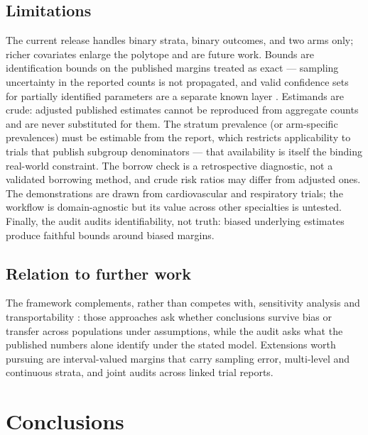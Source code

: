 \documentclass[article]{ajs}
\begin{document}
\subsection{Limitations}

The current release handles binary strata, binary outcomes, and two arms
only; richer covariates enlarge the polytope and are future work. Bounds
are identification bounds on the published margins treated as exact ---
sampling uncertainty in the reported counts is not propagated, and
valid confidence sets for partially identified parameters are a
separate known layer \citep{imbens2004}. Estimands are crude: adjusted
published estimates cannot be reproduced from aggregate counts and are
never substituted for them. The stratum prevalence (or arm-specific
prevalences) must be estimable from the report, which restricts
applicability to trials that publish subgroup denominators --- that
availability is itself the binding real-world constraint. The borrow
check is a retrospective diagnostic, not a validated borrowing method,
and crude risk ratios may differ from adjusted ones. The demonstrations
are drawn from cardiovascular and respiratory trials; the workflow is
domain-agnostic but its value across other specialties is untested.
Finally, the audit audits identifiability, not truth: biased underlying
estimates produce faithful bounds around biased margins.

\subsection{Relation to further work}

The framework complements, rather than competes with, sensitivity
analysis \citep{vanderweele2017} and transportability
\citep{pearlbareinboim2014}: those approaches ask whether conclusions
survive bias or transfer across populations under assumptions, while the
audit asks what the published numbers alone identify under the stated
model. Extensions worth pursuing are interval-valued margins that carry
sampling error, multi-level and continuous strata, and joint audits
across linked trial reports.

\section{Conclusions}
\label{sec:conclusions}
\end{document}
